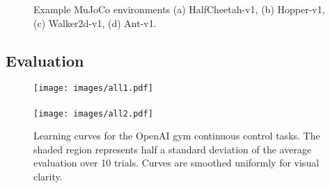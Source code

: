 \documentclass{article}
\begin{document}
\begin{figure}[t] 
\centering
{}
\caption{Example MuJoCo environments (a) HalfCheetah-v1, (b) Hopper-v1, (c) Walker2d-v1, (d) Ant-v1.}
\label{fig:env}
\end{figure}

\subsection{Evaluation} \label{sec:results}


\begin{figure*}[t]
\centering
\captionsetup[subfloat]{captionskip=-8pt}
\texttt{[image: images/all1.pdf]}\\
\subfloat[HalfCheetah-v1]{\hspace{0.28\linewidth}}
\subfloat[Hopper-v1]{\hspace{0.24\linewidth}}
\subfloat[Walker2d-v1]{\hspace{0.24\linewidth}}
\subfloat[Ant-v1]{\hspace{0.24\linewidth}}\\
\texttt{[image: images/all2.pdf]}\\
\subfloat[Reacher-v1]{\hspace{0.28\linewidth}}
\subfloat[InvertedPendulum-v1]{\hspace{0.24\linewidth}}
\subfloat[InvertedDoublePendulum-v1]{\hspace{0.24\linewidth}}
\caption{Learning curves for the OpenAI gym continuous control tasks. The shaded region represents half a standard deviation of the average evaluation over 10 trials. Curves are smoothed uniformly for visual clarity.} \label{OpenAIcurves}
\end{figure*}
\end{document}
